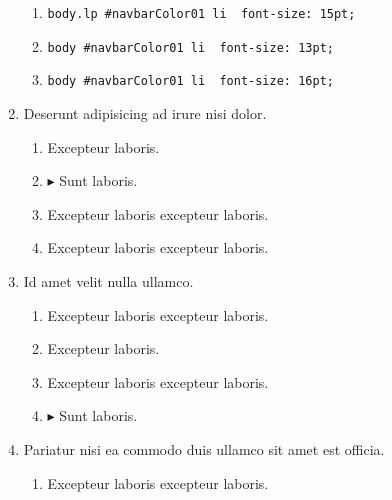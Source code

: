 \documentclass[a4paper,12pt]{article}
\begin{document}
\begin{enumerate}[label=\textbf{\arabic*.}]
\begin{enumerate}
		\item  \texttt{body.lp \#navbarColor01 li { font-size: 15pt; }}
    
		\item  \texttt{body \#navbarColor01 li { font-size: 13pt; }}
    
		\item  \texttt{body \#navbarColor01 li { font-size: 16pt; }}
  
	\end{enumerate}

\item Deserunt adipisicing ad irure nisi dolor.
\begin{multicols}{2}
	\begin{enumerate}
		\item  Excepteur laboris.
    
		\item $\blacktriangleright$  Sunt laboris.
    
		\item  Excepteur laboris excepteur laboris.
  
		\item  Excepteur laboris excepteur laboris.
    
	\end{enumerate}

\end{multicols}
\item Id amet velit nulla ullamco.
\begin{multicols}{2}
	\begin{enumerate}
		\item  Excepteur laboris excepteur laboris.
  
		\item  Excepteur laboris.
    
		\item  Excepteur laboris excepteur laboris.
    
		\item $\blacktriangleright$  Sunt laboris.
    
	\end{enumerate}

\end{multicols}
\item Pariatur nisi ea commodo duis ullamco sit amet est officia.
\begin{multicols}{2}
	\begin{enumerate}
		\item  Excepteur laboris excepteur laboris.
  

\end{enumerate}
\end{multicols}
\end{enumerate}
\end{document}
